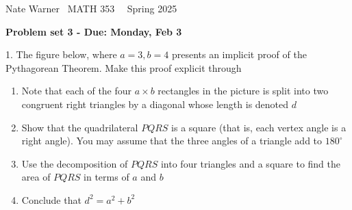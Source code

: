 \documentclass{report}
\title{\Huge{}}
\author{\huge{Nathan Warner}}
\date{\huge{}}
\begin{document}
    \pagebreak \bigbreak \noindent
    Nate Warner \ \quad \quad \quad \quad \quad \quad \quad \quad \quad \quad \quad \quad  MATH 353 \quad  \quad \quad \quad \quad \quad \quad \quad \quad \ \ \quad \quad Spring 2025
    \begin{center}
        \textbf{Problem set 3 - Due: Monday, Feb 3}
    \end{center}
    \bigbreak \noindent 
    \begin{mdframed}
        1. The figure below, where $a=3,b=4$ presents an implicit proof of the Pythagorean Theorem. Make this proof explicit through
        \begin{enumerate}[label=(\alph*)]
            \item Note that each of the four $a\times b$ rectangles in the picture is split into two congruent right triangles by a diagonal whose length is denoted $d$
            \item Show that the quadrilateral $PQRS$ is a square (that is, each vertex angle is a right angle). You may assume that the three angles of a triangle add to $180^{\circ}$
            \item Use the decomposition of $PQRS$ into four triangles and a square to find the area of $PQRS$ in terms of $a$ and $b$
            \item Conclude that $d^{2}= a^{2} + b^{2}$
        \end{enumerate}
    \end{mdframed}
\end{document}
